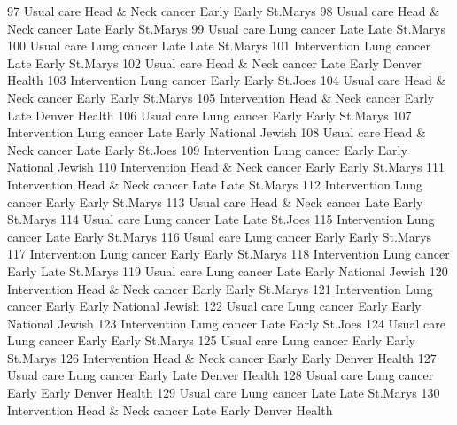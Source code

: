 \documentclass[
  letterpaper,
  DIV=11,
  numbers=noendperiod]{scrreprt}
\newenvironment{Shaded}{\begin{snugshade}}{\end{snugshade}}
\newcommand{\NormalTok}[1]{\textcolor[rgb]{0.00,0.23,0.31}{#1}}
\begin{document}
\begin{Shaded}
\begin{Highlighting}[]
\NormalTok{97    Usual care Head \& Neck cancer   Early Early        St.Marys}
\NormalTok{98    Usual care Head \& Neck cancer    Late Early        St.Marys}
\NormalTok{99    Usual care        Lung cancer    Late  Late        St.Marys}
\NormalTok{100   Usual care        Lung cancer    Late  Late        St.Marys}
\NormalTok{101 Intervention        Lung cancer    Late Early        St.Marys}
\NormalTok{102   Usual care Head \& Neck cancer    Late Early   Denver Health}
\NormalTok{103 Intervention        Lung cancer   Early Early         St.Joes}
\NormalTok{104   Usual care Head \& Neck cancer   Early Early        St.Marys}
\NormalTok{105 Intervention Head \& Neck cancer   Early  Late   Denver Health}
\NormalTok{106   Usual care        Lung cancer   Early Early        St.Marys}
\NormalTok{107 Intervention        Lung cancer    Late Early National Jewish}
\NormalTok{108   Usual care Head \& Neck cancer    Late Early         St.Joes}
\NormalTok{109 Intervention        Lung cancer   Early Early National Jewish}
\NormalTok{110 Intervention Head \& Neck cancer   Early Early        St.Marys}
\NormalTok{111 Intervention Head \& Neck cancer    Late  Late        St.Marys}
\NormalTok{112 Intervention        Lung cancer   Early Early        St.Marys}
\NormalTok{113   Usual care Head \& Neck cancer    Late Early        St.Marys}
\NormalTok{114   Usual care        Lung cancer    Late  Late         St.Joes}
\NormalTok{115 Intervention        Lung cancer    Late Early        St.Marys}
\NormalTok{116   Usual care        Lung cancer   Early Early        St.Marys}
\NormalTok{117 Intervention        Lung cancer   Early Early        St.Marys}
\NormalTok{118 Intervention        Lung cancer   Early  Late        St.Marys}
\NormalTok{119   Usual care        Lung cancer    Late Early National Jewish}
\NormalTok{120 Intervention Head \& Neck cancer   Early Early        St.Marys}
\NormalTok{121 Intervention        Lung cancer   Early Early National Jewish}
\NormalTok{122   Usual care        Lung cancer   Early Early National Jewish}
\NormalTok{123 Intervention        Lung cancer    Late Early         St.Joes}
\NormalTok{124   Usual care        Lung cancer   Early Early        St.Marys}
\NormalTok{125   Usual care        Lung cancer   Early Early        St.Marys}
\NormalTok{126 Intervention Head \& Neck cancer   Early Early   Denver Health}
\NormalTok{127   Usual care        Lung cancer   Early  Late   Denver Health}
\NormalTok{128   Usual care        Lung cancer   Early Early   Denver Health}
\NormalTok{129   Usual care        Lung cancer    Late  Late        St.Marys}
\NormalTok{130 Intervention Head \& Neck cancer    Late Early   Denver Health}

\end{Highlighting}
\end{Shaded}
\end{document}
